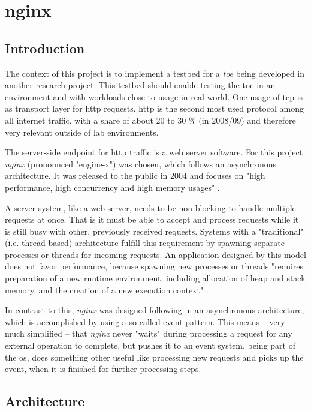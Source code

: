 \chapter{nginx}
\label{ch:nginx}

\section{Introduction}

The context of this project is to implement a testbed for a \textit{\gls{toe}} being developed in another research project. This testbed should enable testing the \gls{toe} in an environment and with workloads close to usage in real world. One usage of \gls{tcp} is as transport layer for \gls{http} requests. \gls{http} is the second most used protocol among all internet traffic, with a share of about 20 to 30 \% (in 2008/09) \cite{internet_study} and therefore very relevant outside of lab environments. 

The server-side endpoint for \gls{http} traffic is a web server software. For this project \textit{nginx} (pronounced "engine-x") was chosen, which follows an asynchronous architecture. It was released to the public in 2004 and focuses on "high performance, high concurrency and high memory usages" \cite{aosa}.

A server system, like a web server, needs to be non-blocking to handle multiple requests at once. That is it must be able to accept and process requests while it is still busy with other, previously received requests. Systems with a "traditional" (i.e. thread-based) architecture fulfill this requirement by spawning separate processes or threads for incoming requests. An application designed by this model does not favor performance, because spawning new processes or threads "requires preparation of a new runtime environment, including allocation of heap and stack memory, and the creation of a new execution context" \cite{aosa}.

In contrast to this, \textit{nginx} was designed following in an asynchronous architecture, which is accomplished by using a so called event-pattern. This means -- very much simplified -- that \textit{nginx} never "waits" during processing a request for any external operation to complete, but pushes it to an event system, being part of the \gls{os}, does something other useful like processing new requests and picks up the event, when it is finished for further processing steps.

\section{Architecture}
\label{sec:nginx-arch}

